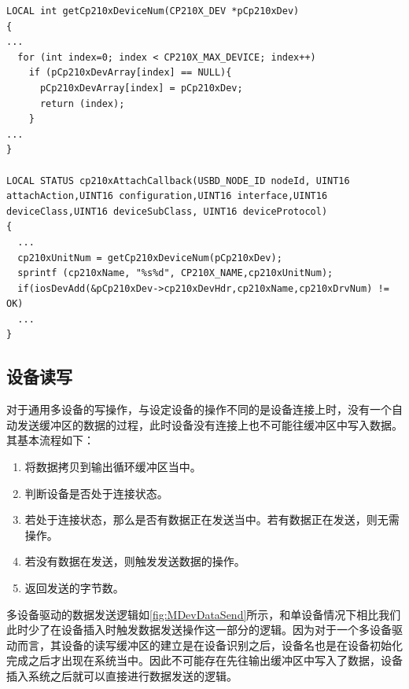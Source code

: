 \lstset{language=C}
\begin{lstlisting}
LOCAL int getCp210xDeviceNum(CP210X_DEV *pCp210xDev)
{
...
  for (int index=0; index < CP210X_MAX_DEVICE; index++)
    if (pCp210xDevArray[index] == NULL){
      pCp210xDevArray[index] = pCp210xDev;
      return (index);
    }
...
}
	
LOCAL STATUS cp210xAttachCallback(USBD_NODE_ID nodeId, UINT16 attachAction,UINT16 configuration,UINT16 interface,UINT16 deviceClass,UINT16 deviceSubClass, UINT16 deviceProtocol)
{
  ...
  cp210xUnitNum = getCp210xDeviceNum(pCp210xDev);
  sprintf (cp210xName, "%s%d", CP210X_NAME,cp210xUnitNum);
  if(iosDevAdd(&pCp210xDev->cp210xDevHdr,cp210xName,cp210xDrvNum) != OK)
  ...
}
\end{lstlisting}





\subsection{设备读写}
	
		
	对于通用多设备的写操作，与设定设备的操作不同的是设备连接上时，没有一个自动发送缓冲区的数据的过程，此时设备没有连接上也不可能往缓冲区中写入数据。其基本流程如下：	
	
	\begin{enumerate}
	\item 将数据拷贝到输出循环缓冲区当中。
	\item 判断设备是否处于连接状态。
	\item 若处于连接状态，那么是否有数据正在发送当中。若有数据正在发送，则无需操作。
	\item 若没有数据在发送，则触发发送数据的操作。
	\item 返回发送的字节数。
	\end{enumerate}
	
	
	多设备驱动的数据发送逻辑如\autoref{fig:MDevDataSend}所示，和单设备情况下相比我们此时少了在设备插入时触发数据发送操作这一部分的逻辑。因为对于一个多设备驱动而言，其设备的读写缓冲区的建立是在设备识别之后，设备名也是在设备初始化完成之后才出现在系统当中。因此不可能存在先往输出缓冲区中写入了数据，设备插入系统之后就可以直接进行数据发送的逻辑。
	
